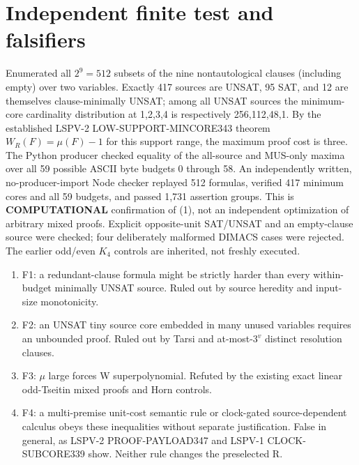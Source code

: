 \documentclass[11pt]{article}
\begin{document}
\section*{Independent finite test and falsifiers}
Enumerated all $2^9=512$ subsets of the nine nontautological clauses (including empty) over two variables. Exactly 417 sources are UNSAT, 95 SAT, and 12 are themselves clause-minimally UNSAT; among all UNSAT sources the minimum-core cardinality distribution at 1,2,3,4 is respectively 256,112,48,1. By the established LSPV-2 LOW-SUPPORT-MINCORE343 theorem $W_R(F)=\mu(F)-1$ for this support range, the maximum proof cost is three. The Python producer checked equality of the all-source and MUS-only maxima over all 59 possible ASCII byte budgets 0 through 58. An independently written, no-producer-import Node checker replayed 512 formulas, verified 417 minimum cores and all 59 budgets, and passed 1,731 assertion groups. This is \textbf{COMPUTATIONAL} confirmation of (1), not an independent optimization of arbitrary mixed proofs. Explicit opposite-unit SAT/UNSAT and an empty-clause source were checked; four deliberately malformed DIMACS cases were rejected. The earlier odd/even $K_4$ controls are inherited, not freshly executed.

\begin{enumerate}
\item[] F1: a redundant-clause formula might be strictly harder than every within-budget minimally UNSAT source. Ruled out by source heredity and input-size monotonicity.
\item[] F2: an UNSAT tiny source core embedded in many unused variables requires an unbounded proof. Ruled out by Tarsi and at-most-$3^v$ distinct resolution clauses.
\item[] F3: $\mu$ large forces W superpolynomial. Refuted by the existing exact linear odd-Tseitin mixed proofs and Horn controls.
\item[] F4: a multi-premise unit-cost semantic rule or clock-gated source-dependent calculus obeys these inequalities without separate justification. False in general, as LSPV-2 PROOF-PAYLOAD347 and LSPV-1 CLOCK-SUBCORE339 show. Neither rule changes the preselected R.
\end{enumerate}
\end{document}
